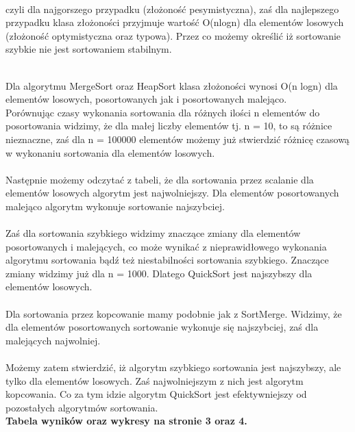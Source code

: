 \documentclass{article}
\begin{document}
\begin{flushleft}
\\czyli dla najgorszego przypadku (złożoność pesymistyczna), zaś dla najlepszego przypadku klasa złożoności przyjmuje wartość O(nlogn) dla elementów losowych (złożoność optymistyczna oraz typowa). Przez co możemy określić iż sortowanie szybkie nie jest sortowaniem stabilnym. \\
\\
\item Dla algorytmu MergeSort oraz HeapSort klasa złożoności wynosi O(n logn) dla elementów losowych, posortowanych jak i posortowanych malejąco.
\indent
\\Porównując czasy wykonania sortowania dla różnych ilości n elementów do posortowania widzimy, że dla małej liczby elementów tj. n = 10, to są różnice nieznaczne, zaś dla n = 100000 elementów możemy już stwierdzić różnicę czasową w wykonaniu sortowania dla elementów losowych.\\
\indent
\\Następnie możemy odczytać z tabeli, że dla sortowania przez scalanie dla elementów losowych algorytm jest najwolniejszy. Dla elementów posortowanych malejąco algorytm wykonuje sortowanie najszybciej.\\
\indent
\\Zaś dla sortowania szybkiego widzimy znaczące zmiany dla elementów posortowanych i malejących, co może wynikać z nieprawidłowego wykonania algorytmu sortowania bądź też niestabilności sortowania szybkiego. Znaczące zmiany widzimy już dla n = 1000. Dlatego QuickSort jest najszybszy dla elementów losowych.\\
\indent
\\Dla sortowania przez kopcowanie mamy podobnie jak z SortMerge. Widzimy, że dla elementów posortowanych sortowanie wykonuje się najszybciej, zaś dla malejących najwolniej.\\  
\indent
\\Możemy zatem stwierdzić, iż algorytm szybkiego sortowania jest najszybszy, ale tylko dla elementów losowych. Zaś najwolniejszym z nich jest algorytm kopcowania. Co za tym idzie algorytm QuickSort jest efektywniejszy od pozostałych algorytmów sortowania.\\
\indent
\textbf{Tabela wyników oraz wykresy na stronie 3 oraz 4.}
\\
\begin{figure}[H]

\end{figure}
\end{flushleft}
\end{document}
